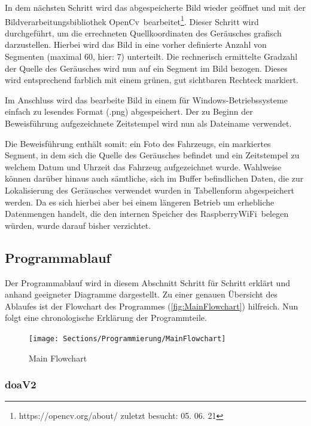 In dem nächsten Schritt wird das abgespeicherte Bild wieder geöffnet und mit der Bildverarbeitungsbibliothek \glqq OpenCv\grqq\ bearbeitet\footnote{https://opencv.org/about/ zuletzt besucht: 05. 06. 21}. Dieser Schritt wird durchgeführt, um die errechneten Quellkoordinaten des Geräusches grafisch darzustellen. Hierbei wird das Bild in eine vorher definierte Anzahl von Segmenten (maximal 60, hier: 7) unterteilt. Die rechnerisch ermittelte Gradzahl der Quelle des Geräusches wird nun auf ein Segment im Bild bezogen. Dieses wird entsprechend farblich mit einem grünen, gut sichtbaren Rechteck markiert.

Im Anschluss wird das bearbeite Bild in einem für Windows-Betriebssysteme einfach zu lesendes Format (.png) abgespeichert. Der zu Beginn der Beweisführung aufgezeichnete Zeitstempel wird nun als Dateiname verwendet.

Die Beweisführung enthält somit: ein Foto des Fahrzeugs, ein markiertes Segment, in dem sich die Quelle des Geräusches befindet und ein Zeitstempel zu welchem Datum und Uhrzeit das Fahrzeug aufgezeichnet wurde. Wahlweise können darüber hinaus auch sämtliche, sich im Buffer befindlichen Daten, die zur Lokalisierung des Geräusches verwendet wurden in Tabellenform abgespeichert werden. Da es sich hierbei aber bei einem längeren Betrieb um erhebliche Datenmengen handelt, die den internen Speicher des \glqq RaspberryWiFi\grqq\ belegen würden, wurde darauf bisher verzichtet. 

\subsection{Programmablauf}

Der Programmablauf wird in diesem Abschnitt Schritt für Schritt erklärt und anhand geeigneter Diagramme dargestellt. Zu einer genauen Übersicht des Ablaufes ist der Flowchart des Programmes (\autoref{fig:MainFlowchart}) hilfreich. Nun folgt eine chronologische Erklärung der Programmteile.

\begin{figure}[h]
	\begin{center}
		\texttt{[image: Sections/Programmierung/MainFlowchart]}
	\end{center}
	\caption{Main Flowchart}
	\label{fig:MainFlowchart}
\end{figure}


\subsubsection{doaV2}

